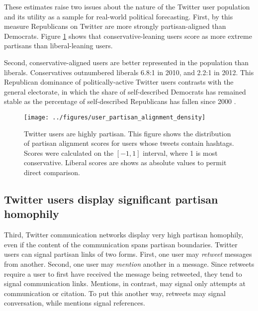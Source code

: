 \documentclass{acm_proc_article-sp}
\begin{document}
These estimates raise two issues about the nature of the Twitter
user population and its utility as a sample for real-world political
forecasting. First, by this measure Republicans on Twitter are more
strongly partisan-aligned than Democrats. Figure
\ref{fig:user-pscore-distribution} shows that conservative-leaning
users score as more extreme partisans than liberal-leaning users.

Second, conservative-aligned users are better represented in the
population than liberals. Conservatives outnumbered liberals 6.8:1 in
2010, and 2.2:1 in 2012. This Republican dominance of
politically-active Twitter users contrasts with the general electorate,
in which the share of self-described Democrats has remained stable as
the percentage of self-described Republicans has fallen since 2000
\cite{pew2012}.



\begin{figure}[ht]
  \centering
  \texttt{[image: ../figures/user\_partisan\_alignment\_density]}
  \caption{Twitter users are highly partisan. This figure shows the distribution of partisan alignment
    scores for users whose tweets contain hashtags. Scores were
    calculated on the $[-1 , 1]$ interval, where 1 is most
    conservative. Liberal scores are shows as absolute values to permit direct comparison.}
  \label{fig:user-pscore-distribution}
\end{figure}




\subsection{Twitter users display significant partisan homophily}
\label{sec:twitt-users-displ}


Third, Twitter communication networks display very high partisan
homophily, even if the content of the communication spans partisan
boundaries. Twitter users can signal partisan links of two
forms. First, one user may \textit{retweet} messages from
another. Second, one user may \textit{mention} another in a
message. Since retweets require a user to first have received the
message being retweeted, they tend to signal communication
links. Mentions, in contrast, may signal only attempts at
communication or citation. To put this another way, retweets may
signal conversation, while mentions signal references.
\end{document}
